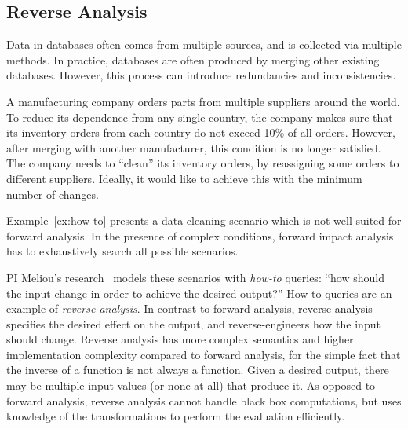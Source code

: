 


\subsection{Reverse Analysis} %
\label{sub:reverse_analysis}
Data in databases often comes from multiple sources, and is collected via multiple methods.
In practice, databases are often produced by merging other existing databases. However, this process can introduce redundancies and inconsistencies.

\begin{example}\label{ex:how-to}
	A manufacturing company orders parts from multiple suppliers around the world. To reduce its dependence from any single country, the company makes sure that its inventory orders from each country do not exceed 10\% of all orders. However, after merging with another manufacturer, this condition is no longer satisfied. The company needs to ``clean'' its inventory orders, by reassigning some orders to different suppliers. Ideally, it would like to achieve this with the minimum number of changes.
\end{example}

Example~\ref{ex:how-to} presents a data cleaning scenario which is not well-suited for forward analysis. In the presence of complex conditions, forward impact analysis has to exhaustively search all possible scenarios.

PI Meliou's research~\cite{DBLP:journals/pvldb/MeliouGS11} models
these scenarios with \emph{how-to} queries: ``how should the input
change in order to achieve the desired output?'' How-to queries are an
example of \emph{reverse analysis}. In contrast to forward analysis,
reverse analysis specifies the desired effect on the output, and
reverse-engineers how the input should change. Reverse analysis has
more complex semantics and higher implementation complexity compared
to forward analysis, for the simple fact that the inverse of a
function is not always a function. Given a desired output, there may
be multiple input values (or none at all) that produce it.
As opposed to forward analysis, reverse analysis cannot handle black box computations, but uses knowledge of the transformations to perform the evaluation efficiently.

